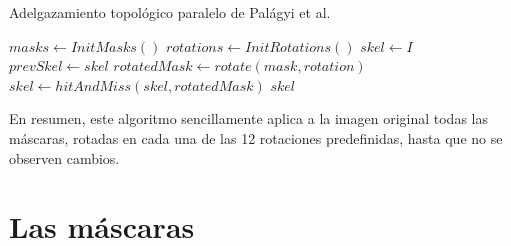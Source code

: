 \begin{algorithm}[H]
\caption{Adelgazamiento topológico paralelo de Palágyi et al.}
\label{alg:thinning}
\begin{algorithmic}[1]
	\State $masks \gets InitMasks()$
	\State $rotations \gets InitRotations()$
	\State $skel \gets I$
  	\Do
    	\State $prevSkel \gets skel$
            	\State $rotatedMask \gets rotate(mask, rotation)$
        		\State $skel \gets hitAndMiss(skel, rotatedMask)$
            \EndFor
        \EndFor
    \State \Return $skel$
\EndFunction
\end{algorithmic}
\end{algorithm}

En resumen, este algoritmo sencillamente aplica a la imagen original todas las máscaras, rotadas en cada una de las 12 rotaciones predefinidas, hasta que no se observen cambios.

\section{Las máscaras}